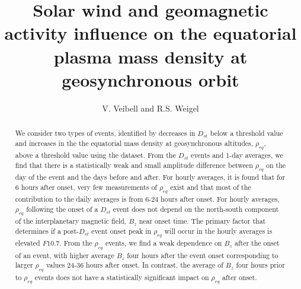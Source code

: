 \documentclass[12pt]{article}
\begin{document}
\title{Solar wind and geomagnetic activity influence on the equatorial plasma mass density at geosynchronous orbit}
\author{V. Veibell and R.S. Weigel}
\doublespacing
\maketitle




\begin{abstract}
We consider two types of events, identified by decreases in $D_{st}$ below a threshold value and increases in the the equatorial mass density at geosynchronous altitudes, $\rho_{eq}$, above a threshold value using the \cite{Takahashi2010} dataset.  From the $D_{st}$ events and 1-day averages, we find that there is a statistically weak and small amplitude difference between $\rho_{eq}$ on the day of the event and the days before and after.  For hourly averages, it is found that for 6 hours after onset, very few measurements of $\rho_{eq}$ exist and that most of the contribution to the daily averages is from 6-24 hours after onset.  For hourly averages, $\rho_{eq}$ following the onset of a $D_{st}$ event does not depend on the north-south component of the interplanetary magnetic field, $B_z$ near onset time. The primary factor that determines if a post-$D_{st}$ event onset peak in $\rho_{eq}$ will occur in the hourly averages is elevated $F10.7$.  From the $\rho_{eq}$ events, we find a weak dependence on $B_{z}$ after the onset of an event, with higher average $B_{z}$ four hours after the event onset corresponding to larger $\rho_{eq}$ values 24-36 hours after onset.  In contrast, the average of $B_z$ four hours prior to $\rho_{eq}$ events does not have a statistically significant impact on $\rho_{eq}$ after onset.
\end{abstract}
\end{document}
